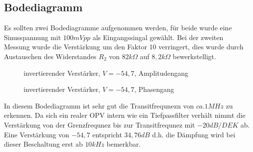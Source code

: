 \subsection{Bodediagramm}
Es sollten zwei Bodediagramme aufgenommen werden, f\"ur beide wurde eine Sinusspannung mit $100mVpp$ als Eingangssingal gew\"ahlt. Bei der zweiten Messung wurde die Verst\"arkung um den Faktor 10 verringert, dies wurde durch Austauschen des Widerstandes $R_2$ von $82k\Omega$ auf $8,2k\Omega$ bewerkstelligt.

\begin{figure}[H]
  \centering
  \caption{invertierender Verst\"arker, $V=-54,7$, Amplitudengang}
\end{figure}
\begin{figure}[H]
  \centering
  \caption{invertierender Verst\"arker, $V=-54,7$, Phasengang}
\end{figure}
\noindent
In diesem Bodediagramm ist sehr gut die Transitfrequnezn von $ca.1MHz$ zu erkennen. Da sich ein realer OPV intern wie ein Tiefpassfilter verh\"alt nimmt die Verst\"arkung von der Grenzfrequnez bis zur Transitfrequnez mit $-20dB/DEK$ ab. Eine Verst\"arkung von $-54,7$ entspricht $34,76dB$ d.h. die D\"ampfung wird bei dieser Beschaltung erst ab $10kHz$ bemerkbar.

